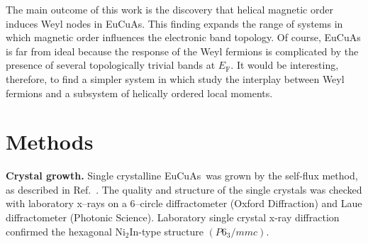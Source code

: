 \documentclass[aps,prl,amsmath,amssymb,amstext,citeautoscript,punctuation,nofootinbib,superscriptaddress,twocolumn]{revtex4-1}
\newcommand{\eca}{EuCuAs}
\begin{document}

The main outcome of this work is the discovery that helical magnetic order induces Weyl nodes in EuCuAs.  This finding expands the range of systems in which magnetic order influences the electronic band topology. Of course, EuCuAs is far from ideal because the response of the Weyl fermions is complicated by the presence of several topologically trivial bands at $E_\textrm{F}$. It would be interesting, therefore, to find a simpler system in which study the interplay between Weyl fermions and a subsystem of helically ordered local moments.


\section{Methods}
\textbf{Crystal growth.} Single crystalline \eca\, was grown by the self-flux method, as described in Ref.~\cite{tong2014magnetic}. The quality and structure of the single crystals was checked with laboratory x--rays on a 6--circle diffractometer (Oxford Diffraction) and Laue diffractometer (Photonic Science). Laboratory single crystal x-ray diffraction confirmed the hexagonal Ni$_2$In-type structure $(P6_3/mmc)$. 
\end{document}
